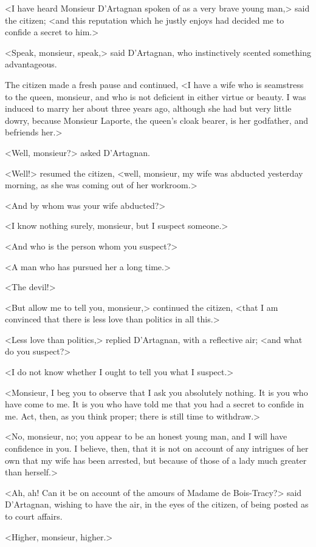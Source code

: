 <I have heard Monsieur D'Artagnan spoken of as a very brave young man,> said the citizen; <and this reputation which he justly enjoys had decided me to confide a secret to him.> 

<Speak, monsieur, speak,> said D'Artagnan, who instinctively scented something advantageous. 

The citizen made a fresh pause and continued, <I have a wife who is seamstress to the queen, monsieur, and who is not deficient in either virtue or beauty. I was induced to marry her about three years ago, although she had but very little dowry, because Monsieur Laporte, the queen's cloak bearer, is her godfather, and befriends her.> 

<Well, monsieur?> asked D'Artagnan. 

<Well!> resumed the citizen, <well, monsieur, my wife was abducted yesterday morning, as she was coming out of her workroom.> 

<And by whom was your wife abducted?> 

<I know nothing surely, monsieur, but I suspect someone.> 

<And who is the person whom you suspect?> 

<A man who has pursued her a long time.> 

<The devil!> 

<But allow me to tell you, monsieur,> continued the citizen, <that I am convinced that there is less love than politics in all this.> 

<Less love than politics,> replied D'Artagnan, with a reflective air; <and what do you suspect?> 

<I do not know whether I ought to tell you what I suspect.> 

<Monsieur, I beg you to observe that I ask you absolutely nothing. It is you who have come to me. It is you who have told me that you had a secret to confide in me. Act, then, as you think proper; there is still time to withdraw.> 

<No, monsieur, no; you appear to be an honest young man, and I will have confidence in you. I believe, then, that it is not on account of any intrigues of her own that my wife has been arrested, but because of those of a lady much greater than herself.> 

<Ah, ah! Can it be on account of the amours of Madame de Bois-Tracy?> said D'Artagnan, wishing to have the air, in the eyes of the citizen, of being posted as to court affairs. 

<Higher, monsieur, higher.> 

